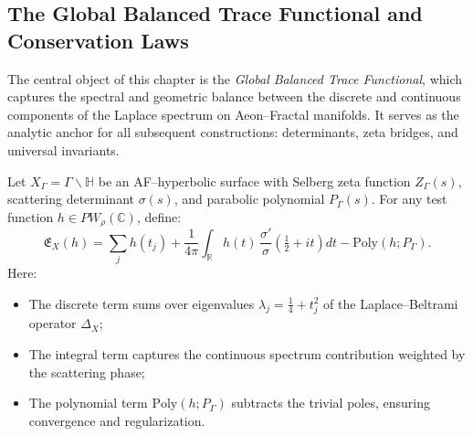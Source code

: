 
\subsection{The Global Balanced Trace Functional and Conservation Laws}
\label{subsec:global-trace-functional}
\relax \hspace{0pt}


The central object of this chapter is the
\emph{Global Balanced Trace Functional},
which captures the spectral and geometric balance
between the discrete and continuous components
of the Laplace spectrum on Aeon–Fractal manifolds.
It serves as the analytic anchor for all subsequent constructions:
determinants, zeta bridges, and universal invariants.

\begin{definition}
\label{def:balanced-trace}
Let \(X_\Gamma = \Gamma \backslash \mathbb{H}\) be an AF–hyperbolic surface
with Selberg zeta function \(Z_\Gamma(s)\),
scattering determinant \(\sigma(s)\),
and parabolic polynomial \(P_\Gamma(s)\).
For any test function \(h \in PW_\rho(\mathbb{C})\),
define:
\begin{equation}
\label{eq:balanced-trace}
\boxed{
\mathfrak{E}_X(h)
=
\sum_{j} h(t_j)
+
\frac{1}{4\pi}\!\int_{\mathbb{R}}
h(t)\,
\frac{\sigma'}{\sigma}\!\left(\tfrac{1}{2}+it\right)\!dt
-
\mathrm{Poly}(h;P_\Gamma)
}.
\end{equation}
Here:
\begin{itemize}
    \item The discrete term sums over eigenvalues \(\lambda_j = \tfrac{1}{4}+t_j^2\)
    of the Laplace–Beltrami operator \(\Delta_X\);
    \item The integral term captures the continuous spectrum contribution
    weighted by the scattering phase;
    \item The polynomial term \(\mathrm{Poly}(h;P_\Gamma)\)
    subtracts the trivial poles, ensuring convergence and regularization.
\end{itemize}
\end{definition}

